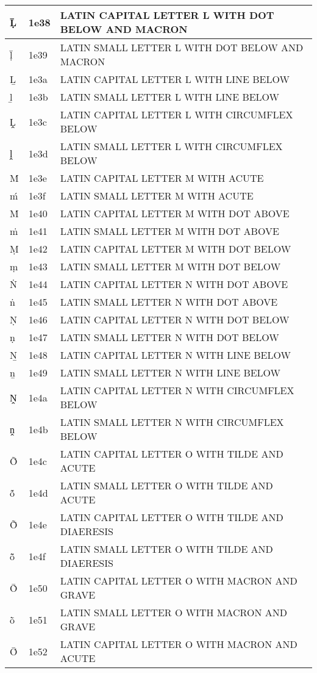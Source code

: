 \documentclass[12pt,letterpaper,openany]{book}
\begin{document}
\begin{center}
\begin{supertabular}{|m{0.25in}|m{0.5in}|m{4in}|}
Ḹ & 1e38 & LATIN CAPITAL LETTER L WITH DOT BELOW AND MACRON\\\hline
ḹ & 1e39 & LATIN SMALL LETTER L WITH DOT BELOW AND MACRON\\\hline
Ḻ & 1e3a & LATIN CAPITAL LETTER L WITH LINE BELOW\\\hline
ḻ & 1e3b & LATIN SMALL LETTER L WITH LINE BELOW\\\hline
Ḽ & 1e3c & LATIN CAPITAL LETTER L WITH CIRCUMFLEX BELOW\\\hline
ḽ & 1e3d & LATIN SMALL LETTER L WITH CIRCUMFLEX BELOW\\\hline
Ḿ & 1e3e & LATIN CAPITAL LETTER M WITH ACUTE\\\hline
ḿ & 1e3f & LATIN SMALL LETTER M WITH ACUTE\\\hline
Ṁ & 1e40 & LATIN CAPITAL LETTER M WITH DOT ABOVE\\\hline
ṁ & 1e41 & LATIN SMALL LETTER M WITH DOT ABOVE\\\hline
Ṃ & 1e42 & LATIN CAPITAL LETTER M WITH DOT BELOW\\\hline
ṃ & 1e43 & LATIN SMALL LETTER M WITH DOT BELOW\\\hline
Ṅ & 1e44 & LATIN CAPITAL LETTER N WITH DOT ABOVE\\\hline
ṅ & 1e45 & LATIN SMALL LETTER N WITH DOT ABOVE\\\hline
Ṇ & 1e46 & LATIN CAPITAL LETTER N WITH DOT BELOW\\\hline
ṇ & 1e47 & LATIN SMALL LETTER N WITH DOT BELOW\\\hline
Ṉ & 1e48 & LATIN CAPITAL LETTER N WITH LINE BELOW\\\hline
ṉ & 1e49 & LATIN SMALL LETTER N WITH LINE BELOW\\\hline
Ṋ & 1e4a & LATIN CAPITAL LETTER N WITH CIRCUMFLEX BELOW\\\hline
ṋ & 1e4b & LATIN SMALL LETTER N WITH CIRCUMFLEX BELOW\\\hline
Ṍ & 1e4c & LATIN CAPITAL LETTER O WITH TILDE AND ACUTE\\\hline
ṍ & 1e4d & LATIN SMALL LETTER O WITH TILDE AND ACUTE\\\hline
Ṏ & 1e4e & LATIN CAPITAL LETTER O WITH TILDE AND DIAERESIS\\\hline
ṏ & 1e4f & LATIN SMALL LETTER O WITH TILDE AND DIAERESIS\\\hline
Ṑ & 1e50 & LATIN CAPITAL LETTER O WITH MACRON AND GRAVE\\\hline
ṑ & 1e51 & LATIN SMALL LETTER O WITH MACRON AND GRAVE\\\hline
Ṓ & 1e52 & LATIN CAPITAL LETTER O WITH MACRON AND ACUTE\\\hline

\end{supertabular}
\end{center}
\end{document}
